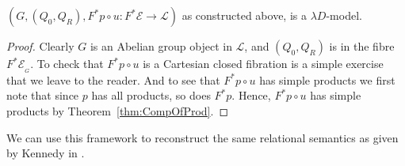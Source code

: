 \documentclass[a4paper,UKenglish]{lipics}
\newcommand{\E}{\mathcal{E}}
\newcommand{\fibre}[2]{#1_{_{#2}}}
\begin{document}
\begin{theorem}
$(G,(Q_0,Q_R), F^\ast p \circ u :F^{\ast} \E \rightarrow \mathcal{L})$ as constructed above, is a $\lambda D$-model.
\end{theorem}

\begin{proof}
Clearly $G$ is an Abelian group object in $\mathcal{L}$, and $(Q_0, Q_R)$ is in the fibre $\fibre{F^\ast \E}{G}$. To check that $F^\ast p \circ u$ is a Cartesian closed fibration is a simple exercise that we leave to the reader. And to see that $F^\ast p \circ u$ has simple products we first note that since $p$ has all products, so does $F^\ast p$. Hence, $F^\ast p \circ u$ has simple products by Theorem~\ref{thm:CompOfProd}.
\end{proof}


\noindent We can use this framework to reconstruct the same relational semantics as given by Kennedy in \cite{Kennedy:1997:RPU:263699.263761}.
\end{document}
